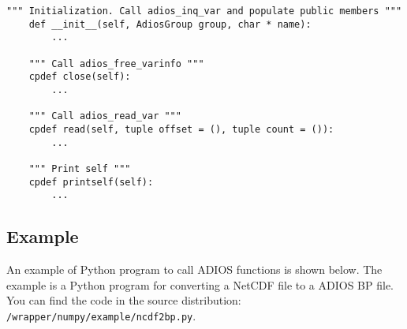 \begin{lstlisting}[language=cython,frame=single, backgroundcolor=\color{gray85},caption={Write functions},label={},]
    """ Initialization. Call adios_inq_var and populate public members """
    def __init__(self, AdiosGroup group, char * name):
        ...
        
    """ Call adios_free_varinfo """
    cpdef close(self):
        ...
        
    """ Call adios_read_var """
    cpdef read(self, tuple offset = (), tuple count = ()):
        ...

    """ Print self """
    cpdef printself(self):
        ...

\end{lstlisting}

\subsection{Example}
An example of Python program to call ADIOS functions is shown below. The example is a Python program for converting a NetCDF file to a ADIOS BP file. You can find the code in the source distribution: \verb+/wrapper/numpy/example/ncdf2bp.py+.

